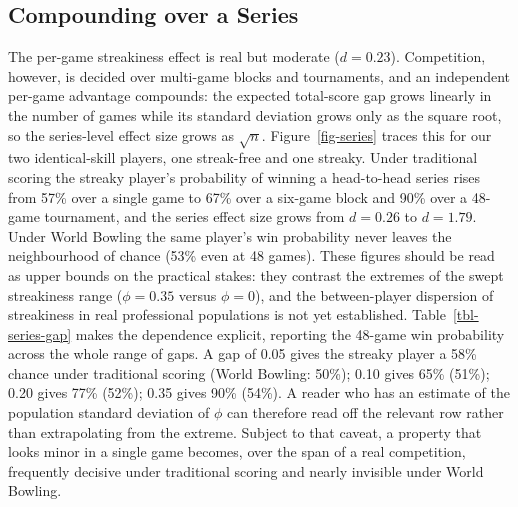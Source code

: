 \documentclass[
  letterpaper,
  DIV=11,
  numbers=noendperiod]{scrartcl}
\begin{document}
\subsection{Compounding over a Series}\label{compounding-over-a-series}

The per-game streakiness effect is real but moderate (\(d = 0.23\)).
Competition, however, is decided over multi-game blocks and tournaments,
and an independent per-game advantage compounds: the expected
total-score gap grows linearly in the number of games while its standard
deviation grows only as the square root, so the series-level effect size
grows as \(\sqrt{n}\). Figure~\ref{fig-series} traces this for our two
identical-skill players, one streak-free and one streaky. Under
traditional scoring the streaky player's probability of winning a
head-to-head series rises from 57\% over a single game to 67\% over a
six-game block and 90\% over a 48-game tournament, and the series effect
size grows from \(d = 0.26\) to \(d = 1.79\). Under World Bowling the
same player's win probability never leaves the neighbourhood of chance
(53\% even at 48 games). These figures should be read as upper bounds on
the practical stakes: they contrast the extremes of the swept
streakiness range (\(\phi = 0.35\) versus \(\phi = 0\)), and the
between-player dispersion of streakiness in real professional
populations is not yet established. Table~\ref{tbl-series-gap} makes the
dependence explicit, reporting the 48-game win probability across the
whole range of gaps. A gap of 0.05 gives the streaky player a 58\%
chance under traditional scoring (World Bowling: 50\%); 0.10 gives 65\%
(51\%); 0.20 gives 77\% (52\%); 0.35 gives 90\% (54\%). A reader who has
an estimate of the population standard deviation of \(\phi\) can
therefore read off the relevant row rather than extrapolating from the
extreme. Subject to that caveat, a property that looks minor in a single
game becomes, over the span of a real competition, frequently decisive
under traditional scoring and nearly invisible under World Bowling.
\end{document}
